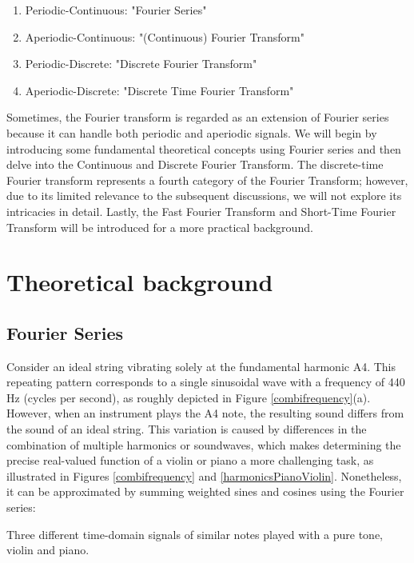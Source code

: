 \begin{enumerate}
    \item Periodic-Continuous: "Fourier Series"
    \item Aperiodic-Continuous: "(Continuous) Fourier Transform"
\item Periodic-Discrete: "Discrete Fourier Transform"
    \item Aperiodic-Discrete: "Discrete Time Fourier Transform"
\end{enumerate}

Sometimes, the Fourier transform is regarded as an extension of Fourier series because it can handle both periodic and aperiodic signals. We will begin by introducing some fundamental theoretical concepts using Fourier series and then delve into the Continuous and Discrete Fourier Transform. The discrete-time Fourier transform represents a fourth category of the Fourier Transform; however, due to its limited relevance to the subsequent discussions, we will not explore its intricacies in detail. Lastly, the Fast Fourier Transform and Short-Time Fourier Transform will be introduced for a more practical background.

\section{Theoretical background}
\subsection{Fourier Series}
Consider an ideal string vibrating solely at the fundamental harmonic A4. This repeating pattern corresponds to a single sinusoidal wave with a frequency of 440 Hz (cycles per second), as roughly depicted in Figure \ref{combifrequency}(a). However, when an instrument plays the A4 note, the resulting sound differs from the sound of an ideal string. This variation is caused by differences in the combination of multiple harmonics or soundwaves, which makes determining the precise real-valued function of a violin or piano a more challenging task, as illustrated in Figures \ref{combifrequency} and \ref{harmonicsPianoViolin}.  Nonetheless, it can be approximated by summing weighted sines and cosines using the Fourier series:

\begin{marginfigure}
\centering

\vspace{0.2cm}
\caption{Three different time-domain signals of similar notes played with a pure tone, violin and piano.}
\label{combifrequency} \vspace{0.3cm}
\end{marginfigure}


